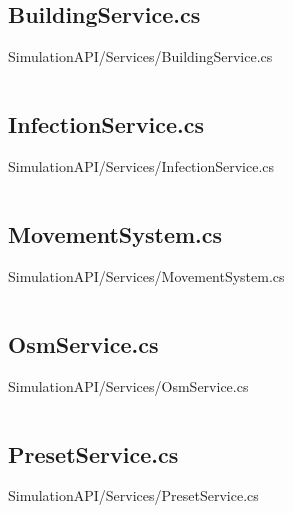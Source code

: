 \inputminted[linenos,breaklines,tabsize=2]{csharp}{/Users/Henry/Desktop/NEAComputerScience/SimulationAPI/Services/BuildingCapacityCalculator.cs}

\makeatletter
\subsection*{BuildingService.cs}
SimulationAPI/Services/BuildingService.cs
\def\@currentlabelname{BuildingService.cs}
\label{code:SimulationAPI:Services:BuildingService.cs}
\makeatother

\inputminted[linenos,breaklines,tabsize=2]{csharp}{/Users/Henry/Desktop/NEAComputerScience/SimulationAPI/Services/BuildingService.cs}

\makeatletter
\subsection*{InfectionService.cs}
SimulationAPI/Services/InfectionService.cs
\def\@currentlabelname{InfectionService.cs}
\label{code:SimulationAPI:Services:InfectionService.cs}
\makeatother

\inputminted[linenos,breaklines,tabsize=2]{csharp}{/Users/Henry/Desktop/NEAComputerScience/SimulationAPI/Services/InfectionService.cs}

\makeatletter
\subsection*{MovementSystem.cs}
SimulationAPI/Services/MovementSystem.cs
\def\@currentlabelname{MovementSystem.cs}
\label{code:SimulationAPI:Services:MovementSystem.cs}
\makeatother

\inputminted[linenos,breaklines,tabsize=2]{csharp}{/Users/Henry/Desktop/NEAComputerScience/SimulationAPI/Services/MovementSystem.cs}

\makeatletter
\subsection*{OsmService.cs}
SimulationAPI/Services/OsmService.cs
\def\@currentlabelname{OsmService.cs}
\label{code:SimulationAPI:Services:OsmService.cs}
\makeatother

\inputminted[linenos,breaklines,tabsize=2]{csharp}{/Users/Henry/Desktop/NEAComputerScience/SimulationAPI/Services/OsmService.cs}

\makeatletter
\subsection*{PresetService.cs}
SimulationAPI/Services/PresetService.cs
\def\@currentlabelname{PresetService.cs}
\label{code:SimulationAPI:Services:PresetService.cs}
\makeatother

